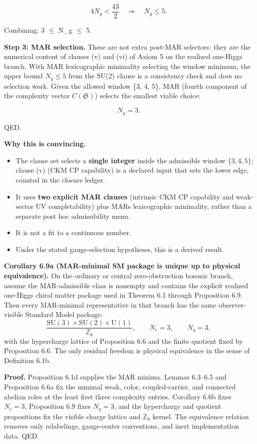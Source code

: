 \[
4 N_g < \frac{43}{2} \quad \Rightarrow \quad N_g \le 5.
\]

Combining: 3 \ensuremath{\leq} N\_g \ensuremath{\leq} 5.

\textbf{Step 3: MAR selection.} These are not extra post-MAR selectors: they are the numerical content of clauses (v) and (vi) of Axiom 5 on the realized one-Higgs branch. With MAR lexicographic minimality selecting the window minimum, the upper bound \(N_g\le5\) from the SU(2) clause is a consistency check and does no selection work. Given the allowed window \{3, 4, 5\}, MAR (fourth component of the complexity vector \(C(\mathfrak S)\)) selects the smallest viable choice:

\[
N_g = 3.
\]

QED.

\textbf{Why this is convincing.}

\begin{itemize}
\tightlist
\item
  The clause set selects a \textbf{single integer} inside the admissible window \(\{3,4,5\}\); clause (v) (CKM CP capability) is a declared input that sets the lower edge, counted in the closure ledger.
\item
  It uses \textbf{two explicit MAR clauses} (intrinsic CKM CP capability and weak-sector UV completability) plus MAR\textquotesingle s lexicographic minimality, rather than a separate post hoc admissibility menu.
\item
  It is not a fit to a continuous number.
\item
  Under the stated gauge-selection hypotheses, this is a derived result.
\end{itemize}

\textbf{Corollary 6.9a (MAR-minimal SM package is unique up to physical equivalence).} On the ordinary or central zero-obstruction bosonic branch, assume the MAR-admissible class is nonempty and contains the explicit realized one-Higgs chiral matter package used in Theorem 6.1 through Proposition 6.9. Then every MAR-minimal representative in that branch has the same observer-visible Standard Model package:
\[
\frac{\mathrm{SU}(3)\times\mathrm{SU}(2)\times\mathrm U(1)}{\mathbb Z_6},
\qquad
N_c=3,\qquad
N_g=3,
\]
with the hypercharge lattice of Proposition 6.6 and the finite quotient fixed by Proposition 6.6. The only residual freedom is physical equivalence in the sense of Definition 6.1b.

\textbf{Proof.} Proposition 6.1d supplies the MAR minima. Lemmas 6.3--6.5 and Proposition 6.6a fix the minimal weak, color, coupled-carrier, and connected abelian roles at the least first three complexity entries. Corollary 6.6b fixes \(N_c=3\), Proposition 6.9 fixes \(N_g=3\), and the hypercharge and quotient propositions fix the visible charge lattice and \(\mathbb Z_6\) kernel. The equivalence relation removes only relabelings, gauge-center conventions, and inert implementation data. QED.

